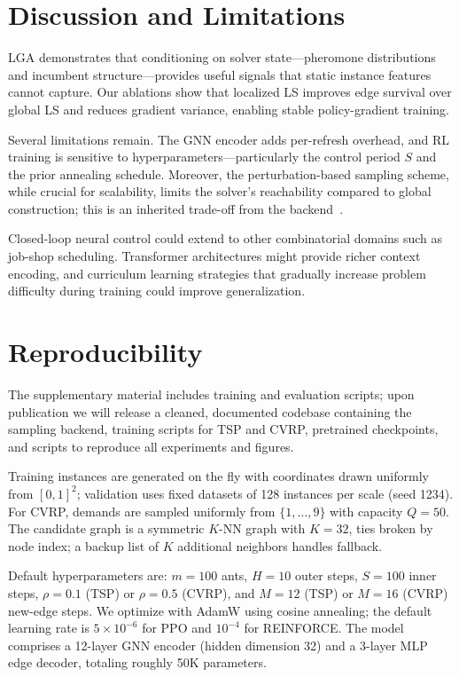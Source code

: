 \documentclass[sigconf,anonymous,review]{acmart}
\theoremstyle{definition}
\theoremstyle{plain}
\newcommand{\LGA}{\textsc{LGA}}
\begin{document}
\section{Discussion and Limitations}
\LGA{} demonstrates that conditioning on solver state---pheromone distributions and incumbent structure---provides useful signals that static instance features cannot capture.
Our ablations show that localized LS improves edge survival over global LS and reduces gradient variance, enabling stable policy-gradient training.

Several limitations remain.
The GNN encoder adds per-refresh overhead, and RL training is sensitive to hyperparameters---particularly the control period $S$ and the prior annealing schedule.
Moreover, the perturbation-based sampling scheme, while crucial for scalability, limits the solver's reachability compared to global construction; this is an inherited trade-off from the backend~\cite{faco}.

Closed-loop neural control could extend to other combinatorial domains such as job-shop scheduling. Transformer architectures might provide richer context encoding, and curriculum learning strategies that gradually increase problem difficulty during training could improve generalization.

\section{Reproducibility}
\label{sec:repro}
The supplementary material includes training and evaluation scripts; upon publication we will release a cleaned, documented codebase containing the sampling backend, training scripts for TSP and CVRP, pretrained checkpoints, and scripts to reproduce all experiments and figures.

Training instances are generated on the fly with coordinates drawn uniformly from $[0,1]^2$; validation uses fixed datasets of 128 instances per scale (seed 1234).
For CVRP, demands are sampled uniformly from $\{1,\ldots,9\}$ with capacity $Q=50$.
The candidate graph is a symmetric $K$-NN graph with $K=32$, ties broken by node index; a backup list of $K$ additional neighbors handles fallback.

Default hyperparameters are: $m=100$ ants, $H=10$ outer steps, $S=100$ inner steps, $\rho=0.1$ (TSP) or $\rho=0.5$ (CVRP), and $M=12$ (TSP) or $M=16$ (CVRP) new-edge steps.
We optimize with AdamW using cosine annealing; the default learning rate is $5{\times}10^{-6}$ for PPO and $10^{-4}$ for REINFORCE.
The model comprises a 12-layer GNN encoder (hidden dimension 32) and a 3-layer MLP edge decoder, totaling roughly 50K parameters.
\end{document}
